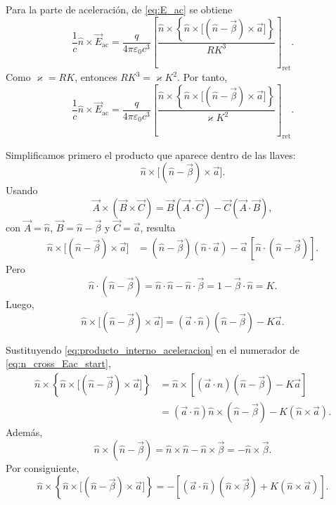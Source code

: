 \documentclass{article}
\numberwithin{equation}{section}
\newcommand{\eps}{\varepsilon_0}
\newcommand{\bv}{\vec{\beta}}
\newcommand{\av}{\vec{a}}
\newcommand{\nh}{\hat{n}}
\newcommand{\K}{K}
\begin{document}
Para la parte de aceleraci\'on, de \eqref{eq:E_ac} se obtiene
\begin{equation*}
  \frac{1}{c}\nh\times\vec{E}_{\mathrm{ac}}
  =\frac{q}{4\pi\eps c^3}
  \left[
  \frac{\nh\times\left\{\nh\times\big[(\nh-\bv)\times\av\big]\right\}}{R\K^3}
  \right]_{\mathrm{ret}}.
\end{equation*}
Como $\varkappa=R\K$, entonces $R\K^3=\varkappa\K^2$. Por tanto,
\begin{equation}
  \frac{1}{c}\nh\times\vec{E}_{\mathrm{ac}}
  =\frac{q}{4\pi\eps c^3}
  \left[
  \frac{\nh\times\left\{\nh\times\big[(\nh-\bv)\times\av\big]\right\}}{\varkappa\K^2}
  \right]_{\mathrm{ret}}.
  \label{eq:n_cross_Eac_start}
\end{equation}

Simplificamos primero el producto que aparece dentro de las llaves:
\begin{equation*}
  \nh\times\big[(\nh-\bv)\times\av\big].
\end{equation*}
Usando
\begin{equation*}
  \vec{A}\times(\vec{B}\times\vec{C})
  =\vec{B}(\vec{A}\cdot\vec{C})-\vec{C}(\vec{A}\cdot\vec{B}),
\end{equation*}
con $\vec{A}=\nh$, $\vec{B}=\nh-\bv$ y $\vec{C}=\av$, resulta
\begin{align*}
  \nh\times\big[(\nh-\bv)\times\av\big]
  &=(\nh-\bv)(\nh\cdot\av)
  -\av\,[\nh\cdot(\nh-\bv)].
\end{align*}
Pero
\begin{equation*}
  \nh\cdot(\nh-\bv)
  =\nh\cdot\nh-\nh\cdot\bv
  =1-\bv\cdot\nh
  =\K.
\end{equation*}
Luego,
\begin{equation}
  \nh\times\big[(\nh-\bv)\times\av\big]
  =(\av\cdot\nh)(\nh-\bv)-\K\av.
  \label{eq:producto_interno_aceleracion}
\end{equation}

Sustituyendo \eqref{eq:producto_interno_aceleracion} en el numerador de
\eqref{eq:n_cross_Eac_start},
\begin{align*}
  \nh\times\left\{\nh\times\big[(\nh-\bv)\times\av\big]\right\}
  &=\nh\times\left[(\av\cdot\nh)(\nh-\bv)-\K\av\right] \\
  &=(\av\cdot\nh)\nh\times(\nh-\bv)-\K(\nh\times\av).
\end{align*}
Adem\'as,
\begin{equation*}
  \nh\times(\nh-\bv)
  =\nh\times\nh-\nh\times\bv
  =-\nh\times\bv.
\end{equation*}
Por consiguiente,
\begin{equation}
  \boxed{
  \nh\times\left\{\nh\times\big[(\nh-\bv)\times\av\big]\right\}
  =-\left[(\av\cdot\nh)(\nh\times\bv)+\K(\nh\times\av)\right].
  }
  \label{eq:identidad_clave}
\end{equation}
\end{document}
